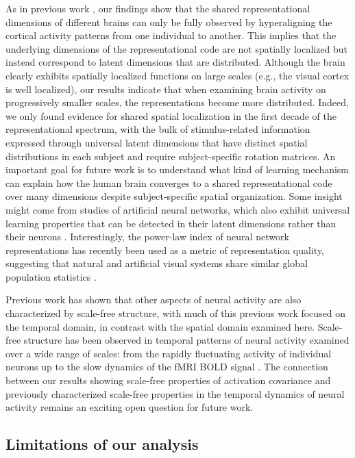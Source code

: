 \documentclass[10pt]{article}
\begin{document}
As in previous work \autocite{Haxby2011}, our findings show that the shared representational dimensions of different brains can only be fully observed by hyperaligning the cortical activity patterns from one individual to another. This implies that the underlying dimensions of the representational code are not spatially localized but instead correspond to latent dimensions that are distributed. Although the brain clearly exhibits spatially localized functions on large scales (e.g., the visual cortex is well localized), our results indicate that when examining brain activity on progressively smaller scales, the representations become more distributed. Indeed, we only found evidence for shared spatial localization in the first decade of the representational spectrum, with the bulk of stimulus-related information expressed through universal latent dimensions that have distinct spatial distributions in each subject and require subject-specific rotation matrices. An important goal for future work is to understand what kind of learning mechanism can explain how the human brain converges to a shared representational code over many dimensions despite subject-specific spatial organization. Some insight might come from studies of artificial neural networks, which also exhibit universal learning properties that can be detected in their latent dimensions rather than their neurons \autocites[e.g.][]{Guth2024,Chen2024}. Interestingly, the power-law index of neural network representations has recently been used as a metric of representation quality, suggesting that natural and artificial visual systems share similar global population statistics \autocite{Agrawal2022}.

Previous work has shown that other aspects of neural activity are also characterized by scale-free structure, with much of this previous work focused on the temporal domain, in contrast with the spatial domain examined here. Scale-free structure has been observed in temporal patterns of neural activity examined over a wide range of scales: from the rapidly fluctuating activity of individual neurons up to the slow dynamics of the fMRI BOLD signal \autocite{He2010,Werner2010,Ciuciu2012,Boonstra2013,He2014}. The connection between our results showing scale-free properties of activation covariance and previously characterized scale-free properties in the temporal dynamics of neural activity remains an exciting open question for future work.

\subsection{Limitations of our analysis}\label{limitations-of-our-analysis}
\end{document}
